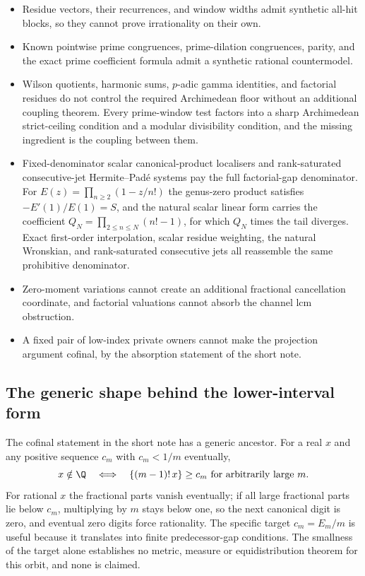 \documentclass[11pt]{article}
\newcommand{\Ser}{S}
\begin{document}
\begin{itemize}
\item Residue vectors, their recurrences, and window widths admit synthetic
  all-hit blocks, so they cannot prove irrationality on their own.
\item Known pointwise prime congruences, prime-dilation congruences, parity,
  and the exact prime coefficient formula admit a synthetic rational
  countermodel.
\item Wilson quotients, harmonic sums, $p$-adic gamma identities, and
  factorial residues do not control the required Archimedean floor without an
  additional coupling theorem.  Every prime-window test factors into a sharp
  Archimedean strict-ceiling condition and a modular divisibility condition,
  and the missing ingredient is the coupling between them.
\item Fixed-denominator scalar canonical-product localisers and
  rank-saturated consecutive-jet Hermite--Pad\'e systems pay the full
  factorial-gap denominator.  For $E(z)=\prod_{n\ge2}(1-z/n!)$ the genus-zero
  product satisfies $-E'(1)/E(1)=\Ser$, and the natural scalar linear form
  carries the coefficient $Q_N=\prod_{2\le n\le N}(n!-1)$, for which $Q_N$
  times the tail diverges.  Exact first-order interpolation, scalar residue
  weighting, the natural Wronskian, and rank-saturated consecutive jets all
  reassemble the same prohibitive denominator.
\item Zero-moment variations cannot create an additional fractional
  cancellation coordinate, and factorial valuations cannot absorb the channel
  lcm obstruction.
\item A fixed pair of low-index private owners cannot make the projection
  argument cofinal, by the absorption statement of the short note.
\end{itemize}

\subsection{The generic shape behind the lower-interval form}
\label{long68:sec:ext-generic}

The cofinal statement in the short note has a generic ancestor.  For a real
$x$ and any positive sequence $c_m$ with $c_m<1/m$ eventually,
\[
 x\notin\Q
 \quad\Longleftrightarrow\quad
 \{(m-1)!\,x\}\ge c_m\ \hbox{for arbitrarily large }m .
\]
For rational $x$ the fractional parts vanish eventually; if all large
fractional parts lie below $c_m$, multiplying by $m$ stays below one, so the
next canonical digit is zero, and eventual zero digits force rationality.
The specific target $c_m=E_m/m$ is useful because it translates into finite
predecessor-gap conditions.  The smallness of the target alone establishes no
metric, measure or equidistribution theorem for this orbit, and none is
claimed.
\clearpage
\end{document}
